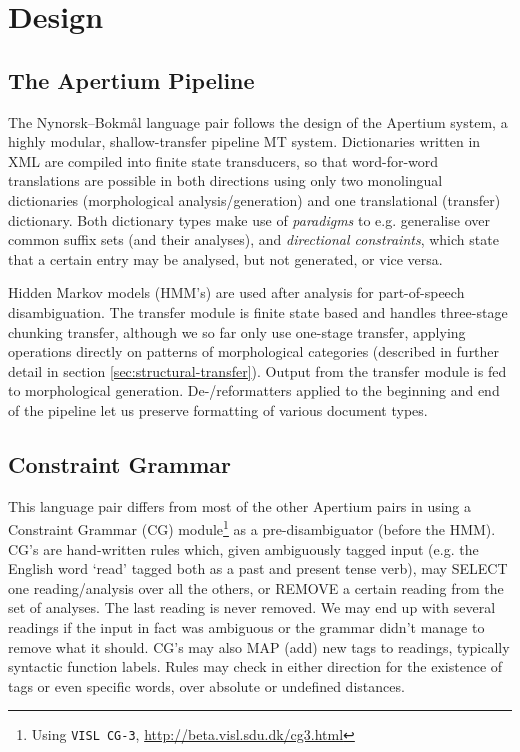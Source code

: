 \documentclass[11pt]{article}
\newcommand{\comment}[1]{\textbf{SKRIV} {\it #1}}
\renewcommand{\comment}[1]{}
\begin{document}
\section{Design}
 \label{sec:design}
\subsection{The Apertium Pipeline}
The Nynorsk–Bokmål language pair follows the design of the Apertium
system, a highly modular, shallow-transfer
pipeline MT system. Dictionaries written in XML are
compiled into finite state transducers, so that word-for-word
translations are possible in both directions using only two
monolingual dictionaries (morphological analysis/generation) and one
translational (transfer) dictionary. Both dictionary types make use of
\emph{paradigms} to e.g. generalise over common suffix sets (and their
analyses), and \emph{directional constraints}, which state that a
certain entry may be analysed, but not generated, or vice versa.

\comment{removed ``first-order'' since second-order HMM's are also
  possible, and we cite sheikh2009trigram below}

Hidden Markov models (HMM's) are used after analysis for
part-of-speech disambiguation.  The transfer module is finite state
based and handles three-stage chunking transfer, although we so far
only use one-stage transfer, applying operations directly on patterns
of morphological categories (described in further detail in section
\ref{sec:structural-transfer}). Output from the transfer module is fed
to morphological generation. De-/reformatters applied to the beginning
and end of the pipeline let us preserve formatting of various document
types.

\subsection{Constraint Grammar}
This language pair differs from most of the other Apertium pairs in
using a Constraint Grammar (CG) module\footnote{Using {\tt \small VISL
    CG-3},
  \href{http://beta.visl.sdu.dk/cg3.html}{http://beta.visl.sdu.dk/cg3.html}
} as a pre-disambiguator (before the HMM). CG's
\citep{karlsson1990cgf} are hand-written rules which, given
ambiguously tagged input (e.g. the English word `read' tagged both as
a past and present tense verb), may SELECT one reading/analysis over
all the others, or REMOVE a certain reading from the set of
analyses. The last reading is never removed. We may end up with
several readings if the input in fact was ambiguous or the grammar
didn't manage to remove what it should. CG's may also MAP (add) new
tags to readings, typically syntactic function labels. Rules may check
in either direction for the existence of tags or even specific words,
over absolute or undefined distances.
\end{document}
